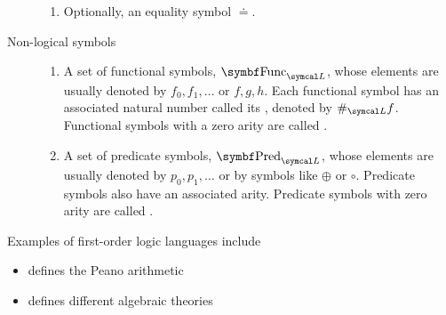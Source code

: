 \begin{definition}
\begin{description}
\begin{enumerate}
      \item Optionally, an equality symbol \( \doteq \).
    \end{enumerate}

    \item[Non-logical symbols]
    \mbox{}
    \begin{enumerate}
      \item A set of functional symbols, \( \Cat{Func}_{\Cal{L}} \), whose elements are usually denoted by \( f_0, f_1, \ldots \) or \( f, g, h \). Each functional symbol has an associated natural number called its , denoted by \( \#_{\Cal{L}} f \). Functional symbols with a zero arity are called .

      \item A set of predicate symbols, \( \Cat{Pred}_{\Cal{L}} \), whose elements are usually denoted by \( p_0, p_1, \ldots \) or by symbols like \( \oplus \) or \( \circ \). Predicate symbols also have an associated arity. Predicate symbols with zero arity are called .
    \end{enumerate}
  \end{description}
\end{definition}

\begin{example}\label{ex:first_order_languages}
  Examples of first-order logic languages include
  \begin{itemize}
    \item {} defines the Peano arithmetic
    \item {} defines different algebraic theories
  \end{itemize}
\end{example}

